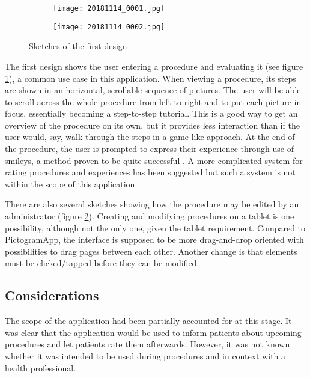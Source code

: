 \begin{figure}
    \centering
    \begin{subfigure}{0.95\textwidth}
        \centering
        \texttt{[image: 20181114\_0001.jpg]}
        \label{fig:sketch-viewprocedure}
    \end{subfigure}
    \begin{subfigure}{0.95\textwidth}
        \centering
        \texttt{[image: 20181114\_0002.jpg]}
        \label{fig:sketch-editprocedure}
    \end{subfigure}
    \caption{Sketches of the first design}
    \label{fig:sketch-firstdesign}
\end{figure}

The first design shows the user entering a procedure and evaluating it (see figure \ref{fig:sketch-viewprocedure}), a common use case in this application. When viewing a procedure, its steps are shown in an horizontal, scrollable sequence of pictures. The user will be able to scroll across the whole procedure from left to right and to put each picture in focus, essentially becoming a step-to-step tutorial. This is a good way to get an overview of the procedure on its own, but it provides less interaction than if the user would, say, walk through the steps in a game-like approach. At the end of the procedure, the user is prompted to express their experience through use of smileys, a method proven to be quite successful \parencite{stalberg2016}. A more complicated system for rating procedures and experiences has been suggested but such a system is not within the scope of this application.

There are also several sketches showing how the procedure may be edited by an administrator (figure \ref{fig:sketch-editprocedure}). Creating and modifying procedures on a tablet is one possibility, although not the only one, given the tablet requirement. Compared to PictogramApp, the interface is supposed to be more drag-and-drop oriented with possibilities to drag pages between each other. Another change is that elements must be clicked/tapped before they can be modified.

\subsection{Considerations}

The scope of the application had been partially accounted for at this stage. It was clear that the application would be used to inform patients about upcoming procedures and let patients rate them afterwards. However, it was not known whether it was intended to be used during procedures and in context with a health professional.

